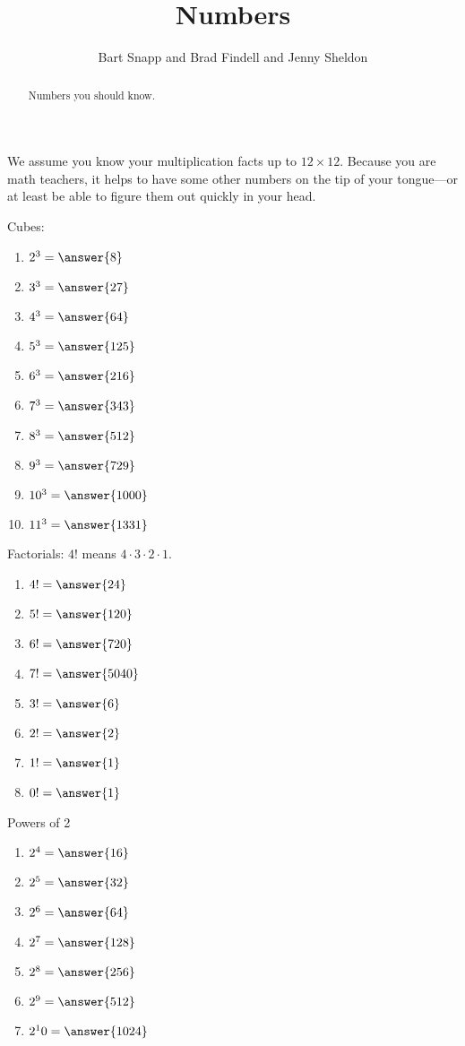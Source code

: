 \documentclass[nooutcomes]{ximera}
\title{Numbers}
\author{Bart Snapp and Brad Findell and Jenny Sheldon}
\begin{document}
\begin{abstract}
Numbers you should know. 
\end{abstract}
\maketitle




We assume you know your multiplication facts up to $12\times 12$. Because you are math teachers, it helps to have some other numbers on the tip of your tongue---or at least be able to figure them out quickly in your head. 


Cubes:
\begin{enumerate}
\item $2^3 = \answer{8}$
\item $3^3 = \answer{27}$
\item $4^3 = \answer{64}$
\item $5^3 = \answer{125}$
\item $6^3 = \answer{216}$
\item $7^3 = \answer{343}$
\item $8^3 = \answer{512}$
\item $9^3 = \answer{729}$
\item $10^3 = \answer{1000}$
\item $11^3 = \answer{1331}$
\end{enumerate}

Factorials: $4!$ means $4\cdot3\cdot2\cdot1$.  
\begin{enumerate}
\item $4!= \answer{24}$
\item $5!= \answer{120}$
\item $6!= \answer{720}$
\item $7!= \answer{5040}$
\item $3!= \answer{6}$
\item $2!= \answer{2}$
\item $1!= \answer{1}$
\item $0!= \answer{1}$
\end{enumerate}

Powers of 2
\begin{enumerate}
\item $2^4 = \answer{16}$
\item $2^5 = \answer{32}$
\item $2^6 = \answer{64}$
\item $2^7 = \answer{128}$
\item $2^8 = \answer{256}$
\item $2^9 = \answer{512}$
\item $2^10 = \answer{1024}$
\end{enumerate}
\end{document}
